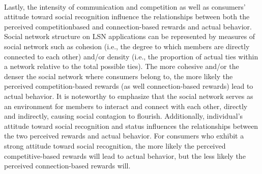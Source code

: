 \paragraph{}Lastly, the intensity of communication and competition as well as consumers’ attitude toward social recognition inﬂuence the relationships between both the perceived competitionbased and connection-based rewards and actual behavior. Social network structure on LSN applications can be represented by measures of social network such as cohesion (i.e., the degree to which members are directly connected to each other) and/or density (i.e., the proportion of actual ties within a network relative to the total possible ties). The more cohesive and/or the denser the social network where consumers belong to, the more likely the perceived competition-based rewards (as well connection-based rewards) lead to actual behavior. It is noteworthy to emphasize that the social network serves as an environment for members to interact and connect with each other, directly and indirectly, causing social contagion to ﬂourish. Additionally, individual’s attitude toward social recognition and status inﬂuences the relationships between the two perceived rewards and actual behavior. For consumers who exhibit a strong attitude toward social recognition, the more likely the perceived competitive-based rewards will lead to actual behavior, but the less likely the perceived connection-based rewards will.

